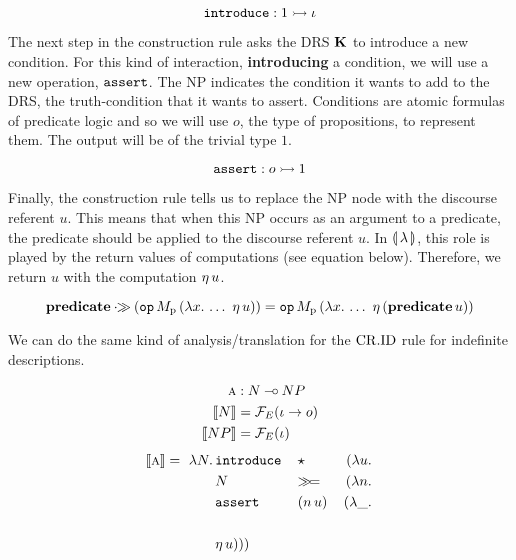 $$
\mathtt{introduce} : 1 \rightarrowtail \iota
$$

The next step in the construction rule asks the DRS $\mathbf{K}$ to introduce a
new condition. For this kind of interaction, \textbf{introducing} a
condition, we will use a new operation, $\mathtt{assert}$. The NP indicates the
condition it wants to add to the DRS, the truth-condition that it wants to
assert. Conditions are atomic formulas of predicate logic and so we will
use $o$, the type of propositions, to represent them. The output will be of
the trivial type $1$.

$$
\mathtt{assert} : o \rightarrowtail 1
$$

Finally, the construction rule tells us to replace the NP node with the
discourse referent $u$. This means that when this NP occurs as an argument
to a predicate, the predicate should be applied to the discourse referent
$u$. In $\llparenthesis \, \lambda \, \rrparenthesis$, this role is played by the return values of
computations (see equation below). Therefore, we return $u$ with the
computation $\eta\,u$.

$$
\textbf{predicate} \mathbin{\cdot\!\!\gg} (\mathtt{op}\,M_{\mathrm{p}}\,(\lambda x.\,  \ldots\
    \eta\,u)) = \mathtt{op}\,M_{\mathrm{p}}\,(\lambda x.\,  \ldots\
    \eta\,(\textbf{predicate}\,u))
$$

We can do the same kind of analysis/translation for the $\mathrm{CR.ID}$ rule for
indefinite descriptions.

\vspace{6mm}

\hspace{-10mm}
\begin{minipage}{0.72\textwidth}
\cridbox
\end{minipage}
\begin{minipage}{0.27\textwidth}
\vspace{0.3cm}
\begin{align*}
\textsc{a} &: N \mathbin{{-}\mkern-3.5mu{\circ}} NP \\
\llbracket N \rrbracket &= \mathcal{F}_E(\iota \to o) \\
\llbracket NP \rrbracket &= \mathcal{F}_E(\iota)
\end{align*}
\begin{align*}
\llbracket \textsc{a} \rrbracket =\ \lambda N.\, & \mathtt{introduce}\,&&\star\, &(\lambda u.\,  \\
                         & N &&\mathbin{\gg\!=} &(\lambda n.\,  \\
                         & \mathtt{assert}\,&&(n\,u)\, &(\lambda \_.\,  \\
                         \\
                         & \eta\,u)))
\end{align*}
\end{minipage}

